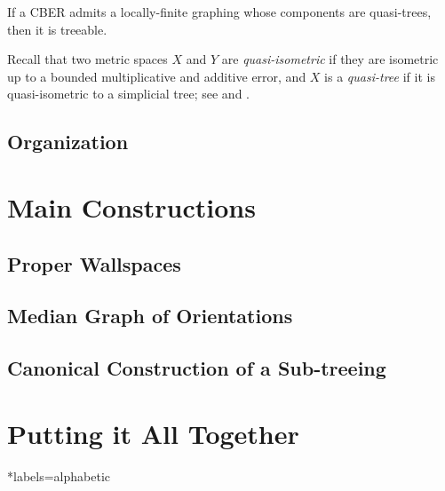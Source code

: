 \documentclass{amsart}
\begin{document}
    \begin{mainTheorem}
        If a CBER admits a locally-finite graphing whose components are quasi-trees, then it is treeable.
    \end{mainTheorem}

    Recall that two metric spaces $X$ and $Y$ are \textit{quasi-isometric} if they are isometric up to a bounded multiplicative and additive error, and $X$ is a \textit{quasi-tree} if it is quasi-isometric to a simplicial tree; see \cite{Gro93} and \cite{DK18}.
    
    \subsection{Organization}

    \section{Main Constructions}

    \subsection{Proper Wallspaces}

    \subsection{Median Graph of Orientations}

    \subsection{Canonical Construction of a Sub-treeing}

    \section{Putting it All Together}

    \begin{theorem}\label{thm:quasi-treeing_implies_treeing}

    \end{theorem}

    \begin{bibdiv}
        \begin{biblist}*{labels={alphabetic}}
        \end{biblist}
    \end{bibdiv}
\end{document}
